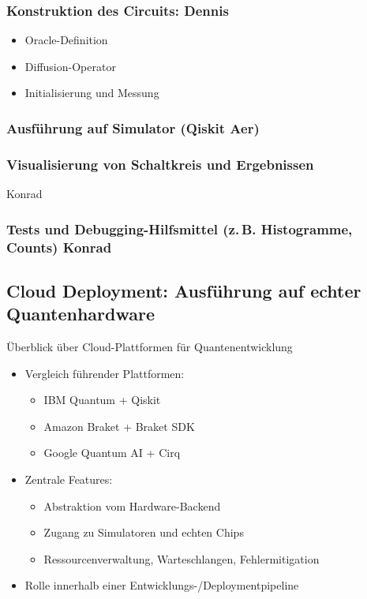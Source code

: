 \subsubsection{Konstruktion des Circuits: Dennis}
    \begin{itemize}
        \item Oracle-Definition
        \item Diffusion-Operator
        \item Initialisierung und Messung
    \end{itemize}

\subsubsection{Ausführung auf Simulator (Qiskit Aer)}
\subsubsection{Visualisierung von Schaltkreis und Ergebnissen} Konrad
\subsubsection{Tests und Debugging-Hilfsmittel (z.\,B. Histogramme, Counts) Konrad}


\subsection{Cloud Deployment: Ausführung auf echter Quantenhardware}

Überblick über Cloud-Plattformen für Quantenentwicklung

\begin{itemize}
    \item Vergleich führender Plattformen:
    \begin{itemize}
        \item IBM Quantum + Qiskit
        \item Amazon Braket + Braket SDK
        \item Google Quantum AI + Cirq
    \end{itemize}
    \item Zentrale Features:
    \begin{itemize}
        \item Abstraktion vom Hardware-Backend
        \item Zugang zu Simulatoren und echten Chips
        \item Ressourcenverwaltung, Warteschlangen, Fehlermitigation
    \end{itemize}
    \item Rolle innerhalb einer Entwicklungs-/Deploymentpipeline
\end{itemize}

